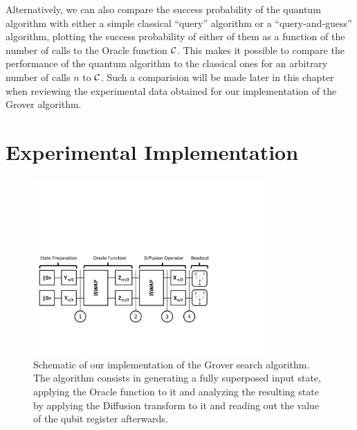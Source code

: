 \smallskip

Alternatively, we can also compare the success probability of the quantum algorithm with either a simple classical ``query'' algorithm or a ``query-and-guess'' algorithm, plotting the success probability of either of them as a function of the number of calls to the Oracle function $\Or$. This makes it possible to compare the performance of the quantum algorithm to the classical ones for an arbitrary number of calls $n$ to $\Or$. Such a comparision will be made later in this chapter when reviewing the experimental data obtained for our implementation of the Grover algorithm.

\section{Experimental Implementation}

\begin{figure}[h!]
	\centering
		\includegraphics[width=0.8\textwidth]{./material/papers/grover/grover_algorithm}
	\caption[Schematic of our implementation of the Grover search algorithm]{Schematic of our implementation of the Grover search algorithm. The algorithm consists in generating a fully superposed input state, applying the Oracle function to it and analyzing the resulting state by applying the Diffusion transform to it and reading out the value of the qubit register afterwards.}
	\label{fig:GroverAlgorithmSchematic}
\end{figure}

